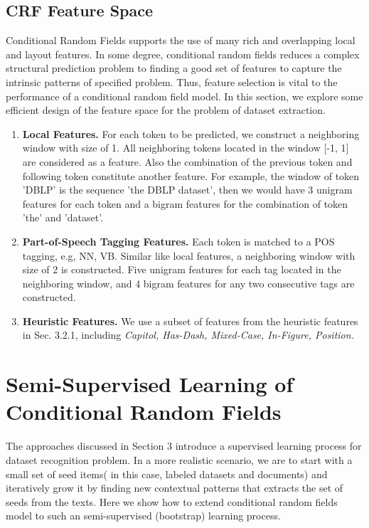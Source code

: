 \documentclass[10pt]{article}
\begin{document}
\subsection{CRF Feature Space}
Conditional Random Fields supports the use of many rich and overlapping local and layout features. In some degree, conditional random fields reduces a complex structural prediction problem to finding a good set of features to capture the intrinsic patterns of specified problem. Thus, feature selection is vital to the performance of a conditional random field model. In this section, we explore some efficient design of the feature space for the problem of dataset extraction.
\begin{enumerate}
\item \textbf{Local Features.} For each token to be predicted, we construct a neighboring window with size of 1. All neighboring tokens located in the window [-1, 1] are considered as a feature. Also the combination of the previous token and following token constitute another feature. For example, the window of token 'DBLP' is the sequence 'the DBLP dataset', then we would have 3 unigram features for each token and a bigram features for the combination of token 'the' and 'dataset'.  
\item \textbf{Part-of-Speech Tagging Features.} Each token is matched to a POS tagging, e.g, NN, VB. Similar like local features, a neighboring window with size of 2 is constructed. Five unigram features for each tag located in the neighboring window, and 4 bigram features for any two consecutive tags are constructed.  
\item \textbf{Heuristic Features.} We use a subset of features from the heuristic features in Sec. 3.2.1, including \textit{Capitol, Has-Dash, Mixed-Case, In-Figure, Position. } 
\end{enumerate}

\section{Semi-Supervised Learning of Conditional Random Fields}
The approaches discussed in Section 3 introduce a supervised learning process for dataset recognition problem. In a more realistic scenario, we are to start with a small set of seed items( in this case, labeled datasets and documents) and iteratively grow it by finding new contextual patterns that extracts the set of seeds from the texts. Here we show how to extend conditional random fields model to such an semi-supervised (bootstrap) learning process. 
\end{document}
